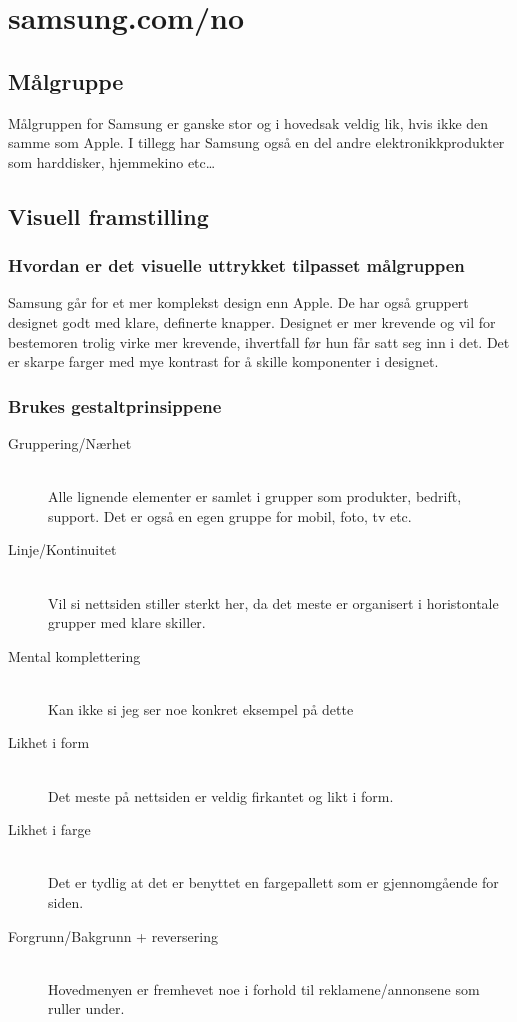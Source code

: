 \section{samsung.com/no}

\subsection{Målgruppe}

Målgruppen for Samsung er ganske stor og i hovedsak veldig lik, hvis ikke den samme som Apple. I tillegg har Samsung også en del andre elektronikkprodukter som harddisker, hjemmekino etc\ldots

\subsection{Visuell framstilling}

\subsubsection{Hvordan er det visuelle uttrykket tilpasset målgruppen}

Samsung går for et mer komplekst design enn Apple. De har også gruppert designet godt med klare, definerte knapper. Designet er mer krevende og vil for bestemoren trolig virke mer krevende, ihvertfall før hun får satt seg inn i det. Det er skarpe farger med mye kontrast for å skille komponenter i designet. 

\subsubsection{Brukes gestaltprinsippene}

\begin{description}
  \item[Gruppering/Nærhet] \hfill \\
  Alle lignende elementer er samlet i grupper som produkter, bedrift, support. Det er også en egen gruppe for mobil, foto, tv etc. 
  \item[Linje/Kontinuitet] \hfill \\
  Vil si nettsiden stiller sterkt her, da det meste er organisert i horistontale grupper med klare skiller.
  \item[Mental komplettering] \hfill \\
    Kan ikke si jeg ser noe konkret eksempel på dette
   \item[Likhet i form] \hfill \\
    Det meste på nettsiden er veldig firkantet og likt i form. 
  \item[Likhet i farge] \hfill \\
    Det er tydlig at det er benyttet en fargepallett som er gjennomgående for siden.
  \item[Forgrunn/Bakgrunn + reversering] \hfill \\
    Hovedmenyen er fremhevet noe i forhold til reklamene/annonsene som ruller under.
\end{description}

